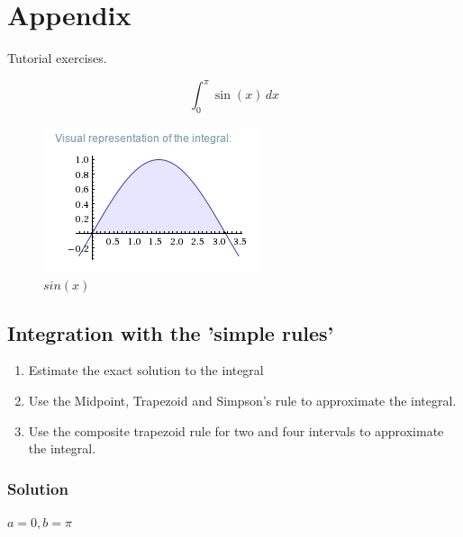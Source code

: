 \section{Appendix}
Tutorial exercises.

\begin{equation}
\int_0^\pi \sin(x) \, dx
\label{eq:}
\end{equation}

\begin{figure}[h]
	\centering
		\includegraphics{graphics/intsinx.png}
	\caption{$sin(x)$}
	\label{fig:intsinx}
\end{figure}


\subsection{Integration with the 'simple rules'}
\begin{enumerate}
	\item Estimate the exact solution to the integral
	\item Use the Midpoint, Trapezoid and Simpson's rule to approximate the integral.
	\item Use the composite trapezoid rule for two and four intervals to approximate the integral.
\end{enumerate}


\subsubsection{Solution}
$a = 0, b = \pi$

